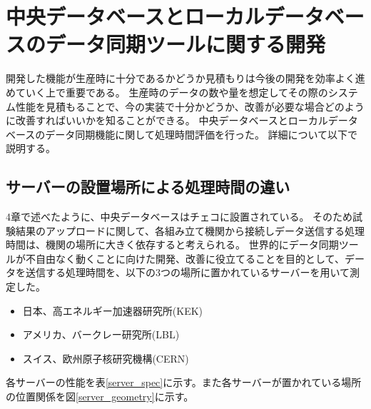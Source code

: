 \chapter{中央データベースとローカルデータベースのデータ同期ツールに関する開発}

開発した機能が生産時に十分であるかどうか見積もりは今後の開発を効率よく進めていく上で重要である。
生産時のデータの数や量を想定してその際のシステム性能を見積もることで、今の実装で十分かどうか、改善が必要な場合どのように改善すればいいかを知ることができる。
中央データベースとローカルデータベースのデータ同期機能に関して処理時間評価を行った。
詳細について以下で説明する。

\section{サーバーの設置場所による処理時間の違い}
4章で述べたように、中央データベースはチェコに設置されている。
そのため試験結果のアップロードに関して、各組み立て機関から接続しデータ送信する処理時間は、機関の場所に大きく依存すると考えられる。
世界的にデータ同期ツールが不自由なく動くことに向けた開発、改善に役立てることを目的として、データを送信する処理時間を、以下の3つの場所に置かれているサーバーを用いて測定した。

\begin{itemize}
  \item 日本、高エネルギー加速器研究所(KEK) 
  \item アメリカ、バークレー研究所(LBL)
  \item スイス、欧州原子核研究機構(CERN)
\end{itemize}

各サーバーの性能を表\ref{server_spec}に示す。また各サーバーが置かれている場所の位置関係を図\ref{server_geometry}に示す。

\begin{table}[tbp]
\caption[サーバーの性能一覧]{サーバーの性能一覧}
\label{server_spec}
\end{table}


